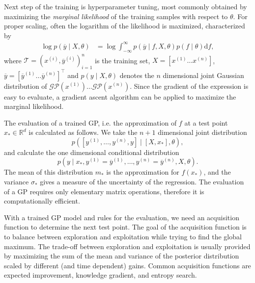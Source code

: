 Next step of the training is hyperparameter tuning, most commonly obtained by maximizing the \textit{marginal likelihood} of the training samples with respect to $\theta$. For proper scaling, often the logarithm of the likelihood is maximized, characterized by
\begin{align}
\log p(\overline{y} \mid {X}, {\theta}) &=\log \int_{-\infty}^{\infty} p(\overline{y} \mid f, {X}, {\theta}) p(f \mid {\theta}) \mathrm{d} f,
\end{align}
where $\mathcal{T} = {(x^{(i)},\overline y^{(i)})}_{i=1}^n$ is the training set, $X=[x^{(1)}\dots x^{(n)}]$, $\overline y = [\overline y^{(1)}\dots \overline y^{(n)}]^\top$ and $p({y} \mid {X}, {\theta})$ denotes the $n$ dimensional joint Gaussian distribution of $\mathcal{GP}(x^{(1)})\dots\mathcal{GP}(x^{(n)})$. Since the gradient of the expression is easy to evaluate, a gradient ascent algorithm can be applied to maximize the marginal likelihood.

The evaluation of a trained GP, i.e. the approximation of $f$ at a test point $x_*\in\mathbb{R}^d$ is calculated as follows. We take the $n+1$ dimensional joint distribution $$p([y^{(1)},\dots,y^{(n)},y ] \mid [X,x_*],\theta),$$ and calculate the one dimensional conditional distribution $$p(y\mid x_*,y^{(1)}=\overline y^{(1)}, \dots ,y^{(n)}=\overline y^{(n)},X,\theta ).$$ The mean of this distribution $m_*$ is the approximation for $f(x_*)$, and the variance $\sigma_*$ gives a measure of the uncertainty of the regression. The evaluation of a GP requires only elementary matrix operations, therefore it is computationally efficient.

With a trained GP model and rules for the evaluation, we need an acquisition function to determine the next test point. The goal of the acquisition function is to balance between exploration and exploitation while trying to find the global maximum. The trade-off between exploration and exploitation is usually provided by maximizing the sum of the mean and variance of the posterior distribution scaled by different (and time dependent) gains. Common acquisition functions are expected improvement, knowledge gradient, and entropy search.

